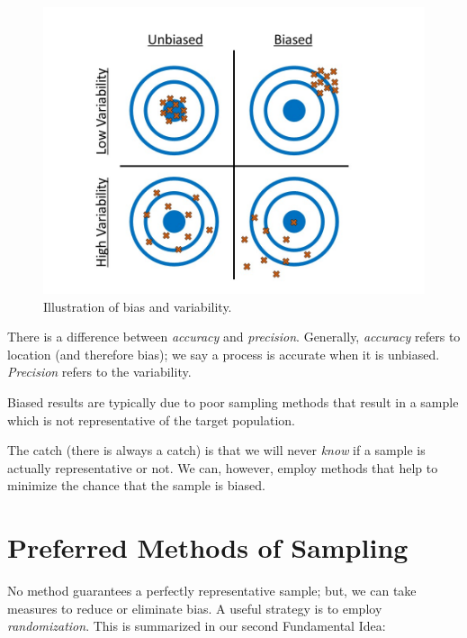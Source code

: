\documentclass[
]{book}
\theoremstyle{plain}
\theoremstyle{mydefn}
\theoremstyle{myexmpl}
\theoremstyle{remark}
\begin{document}
\begin{figure}

{\centering \includegraphics[width=0.8\linewidth]{./images/Data-Bias} 

}

\caption{Illustration of bias and variability.}\label{fig:data-bias}
\end{figure}

\begin{rmdwarning}
There is a difference between \emph{accuracy} and \emph{precision}. Generally, \emph{accuracy} refers to location (and therefore bias); we say a process is accurate when it is unbiased. \emph{Precision} refers to the variability.
\end{rmdwarning}

\begin{rmdkeyidea}
Biased results are typically due to poor sampling methods that result in a sample which is not representative of the target population.
\end{rmdkeyidea}

The catch (there is always a catch) is that we will never \emph{know} if a sample is actually representative or not. We can, however, employ methods that help to minimize the chance that the sample is biased.

\hypertarget{preferred-methods-of-sampling}{%
\section{Preferred Methods of Sampling}\label{preferred-methods-of-sampling}}

No method guarantees a perfectly representative sample; but, we can take measures to reduce or eliminate bias. A useful strategy is to employ \emph{randomization}. This is summarized in our second Fundamental Idea:
\end{document}

